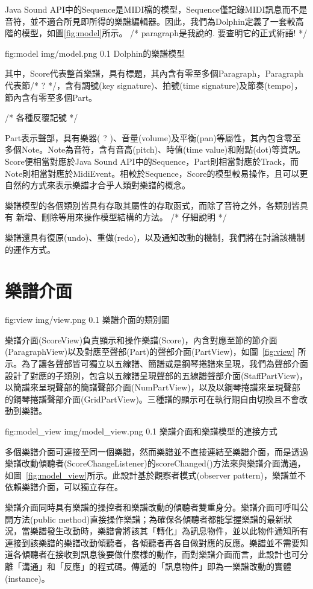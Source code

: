 \documentclass[12pt,a4paper,oneside]{report}
\begin{document}
Java Sound API中的Sequence是MIDI檔的模型，Sequence僅記錄MIDI訊息而不是音符，並不適合所見即所得的樂譜編輯器。因此，我們為Dolphin定義了一套較高階的模型，如圖\ref{fig:model}所示。 /* paragraph是我說的. 要查明它的正式術語! */

\figurewithcaption
{fig:model}
{img/model.png}
{0.1}
{Dolphin的樂譜模型}

其中，Score代表整首樂譜，具有標題，其內含有零至多個Paragraph，Paragraph代表節/* ? */，含有調號(key signature)、拍號(time signature)及節奏(tempo)，節內含有零至多個Part。

/* 各種反覆記號  */ 

Part表示聲部，具有樂器( ? )、音量(volume)及平衡(pan)等屬性，其內包含零至多個Note。Note為音符，含有音高(pitch)、時值(time value)和附點(dot)等資訊。Score便相當對應於Java Sound API中的Sequence，Part則相當對應於Track，而Note則相當對應於MidiEvent。相較於Sequence，Score的模型較易操作，且可以更自然的方式來表示樂譜才合乎人類對樂譜的概念。

樂譜模型的各個類別皆具有存取其屬性的存取函式，而除了音符之外，各類別皆具有
新增、刪除等用來操作模型結構的方法。 /*  
仔細說明  
*/

樂譜還具有復原(undo)、重做(redo)，以及通知改動的機制，我們將在討論該機制的運作方式。


\section{樂譜介面}


\figurewithcaption
{fig:view}
{img/view.png}
{0.1}
{樂譜介面的類別圖}

樂譜介面(ScoreView)負責顯示和操作樂譜(Score)，內含對應至節的節介面(ParagraphView)以及對應至聲部(Part)的聲部介面(PartView)，如圖~\ref{fig:view} 所示。為了讓各聲部皆可獨立以五線譜、簡譜或是鋼琴捲譜來呈現，我們為聲部介面設計了對應的子類別，包含以五線譜呈現聲部的五線譜聲部介面(StaffPartView)，以簡譜來呈現聲部的簡譜聲部介面(NumPartView)，以及以鋼琴捲譜來呈現聲部的鋼琴捲譜聲部介面(GridPartView)。三種譜的顯示可在執行期自由切換且不會改動到樂譜。

\figurewithcaption
{fig:model_view}
{img/model_view.png}
{0.1}
{樂譜介面和樂譜模型的連接方式}

多個樂譜介面可連接至同一個樂譜，然而樂譜並不直接連結至樂譜介面，而是透過樂譜改動傾聽者(ScoreChangeListener)的scoreChanged()方法來與樂譜介面溝通，如圖~\ref{fig:model_view}所示。此設計基於觀察者模式(observer pattern)\cite{designPattern}，樂譜並不依賴樂譜介面，可以獨立存在。

樂譜介面同時具有樂譜的操控者和樂譜改動的傾聽者雙重身分。樂譜介面可呼叫公開方法(public method)直接操作樂譜；為確保各傾聽者都能掌握樂譜的最新狀況，當樂譜發生改動時，樂譜會將該其「轉化」為訊息物件，並以此物件通知所有連接到該樂譜的樂譜改動傾聽者，各傾聽者再各自做對應的反應。樂譜並不需要知道各傾聽者在接收到訊息後要做什麼樣的動作，而對樂譜介面而言，此設計也可分離「溝通」和「反應」的程式碼。傳遞的「訊息物件」即為一樂譜改動的實體(instance)。
\end{document}
